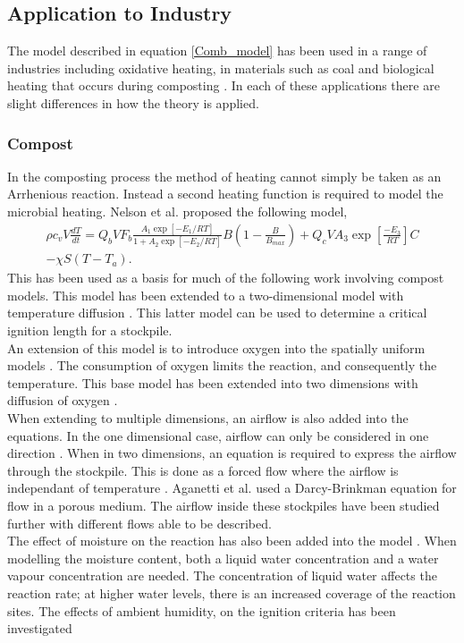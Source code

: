 \subsection{Application to Industry}
The model described in equation \eqref{Comb_model} has been used in a range of industries including oxidative heating, in materials such as coal and biological heating that occurs during composting \cite{bowes}. In each of these applications there are slight differences in how the theory is applied. 
\subsubsection{Compost}
In the composting process the method of heating cannot simply be taken as an Arrhenious reaction. Instead a second heating function is required to model the microbial heating.  Nelson et al.\cite{NELS03} proposed the following model,
\begin{multline}
\rho c_vV\frac{dT}{dt}=Q_bVF_b\frac{A_1\exp[-E_1/RT]}{1+A_2\exp[-E_2/RT]}B\left(1-\frac{B}{B_{max}}\right)+Q_cVA_3\exp\left[\frac{-E_3}{RT}\right]C\\-\chi S\left(T-T_a\right). \label{Bio}
\end{multline}
This has been used as a basis for much of the following work involving compost models. This model has been extended to a two-dimensional model with temperature diffusion \cite{sidhu06}. This latter model can be used to determine a critical ignition length for a stockpile.\\
An extension of this model is to introduce oxygen into the spatially uniform models \cite{nels07}.
The consumption of oxygen limits the reaction, and consequently the temperature. This base model has been extended into two dimensions with diffusion of oxygen \cite{Sidhu2007}.\\
When extending to multiple dimensions, an airflow is also added into the equations.
In the one dimensional case, airflow can only be considered in one direction \cite{luang09,luang10}. When in two dimensions, an equation is required to express the airflow through the stockpile. This is done as a forced flow where the airflow is independant of temperature \cite{luang10b,luang10c}. Aganetti et al. \cite{aga16} used a Darcy-Brinkman equation for flow in a porous medium. The airflow inside these stockpiles have been studied further with different flows able to be described. \cite{AGA17}\\
The  effect of moisture on the reaction has also been added into the model \cite{ZAM11,luang18,luang11a}. When modelling the moisture content, both a liquid water concentration and a water vapour concentration are needed. The concentration of liquid water affects the reaction rate; at higher water levels, there is an increased coverage of the reaction sites. The effects of ambient humidity, on the ignition criteria has been investigated \cite{luang18u} \\
